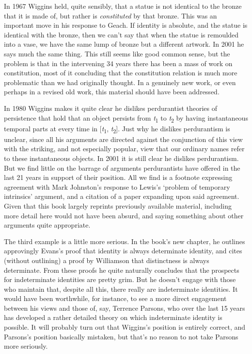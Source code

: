 \documentclass[
  11pt,
  letterpaper,
  DIV=11,
  numbers=noendperiod,
  twoside]{scrartcl}
\begin{document}
In 1967 Wiggins held, quite sensibly, that a statue is not identical to
the bronze that it is made of, but rather is \emph{constituted} by that
bronze. This was an important move in his response to Geach. If identity
is absolute, and the statue is identical with the bronze, then we can't
say that when the statue is remoulded into a vase, we have the same lump
of bronze but a different artwork. In 2001 he says much the same thing.
This still seems like good common sense, but the problem is that in the
intervening 34 years there has been a mass of work on constitution, most
of it concluding that the constitution relation is much more problematic
than we had originally thought. In a genuinely new work, or even perhaps
in a revised old work, this material should have been addressed.

In 1980 Wiggins makes it quite clear he dislikes perdurantist theories
of persistence that hold that an object persists from
\emph{t}­\textsubscript{1} to \emph{t}\textsubscript{2} by having
instantaneous temporal parts at every time in
{[}\emph{t}\textsubscript{1}, \emph{t}\textsubscript{2}{]}. Just why he
dislikes perdurantism is unclear, since all his arguments are directed
against the conjunction of this view with the striking, and not
especially popular, view that our ordinary names refer to these
instantaneous objects. In 2001 it is still clear he dislikes
perdurantism. But we find little on the barrage of arguments
perdurantists have offered in the last 21 years in support of their
position. All we find is a footnote expressing agreement with Mark
Johnston's response to Lewis's `problem of temporary intrinsics'
argument, and a citation of a paper expanding upon said agreement. Given
that this book largely reprints previously available material, including
more detail here would not have been absurd, and saying something about
other arguments quite appropriate.

The third example is a little more serious. In the book's new chapter,
he outlines approvingly Evans's proof that identity is always
determinate identity, and cites (without outlining) a proof by
Williamson that distinctness is always determinate. From these proofs he
quite naturally concludes that the prospects for indeterminate
identities are pretty grim. But he doesn't engage with those who
maintain that, despite all this, there really are indeterminate
identities. It would have been worthwhile, for instance, to see a more
direct engagement between his views and those of, say, Terrence Parsons,
who over the last 15 years has developed a rather detailed theory on
which indeterminate identity is possible. It will probably turn out that
Wiggins's position is entirely correct, and Parsons's position basically
mistaken, but that's no reason to not take Parsons more seriously.
\end{document}
